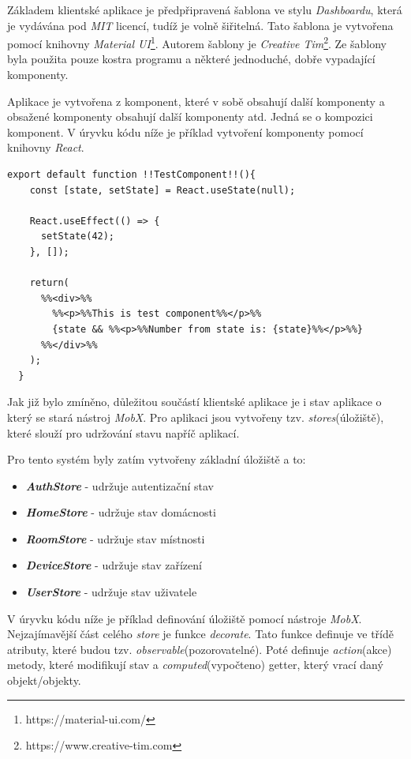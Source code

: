 Základem klientské aplikace je předpřipravená šablona ve stylu \emph{Dashboardu}, která je vydávána pod \emph{MIT} licencí, tudíž je volně šiřitelná.
Tato šablona je vytvořena pomocí knihovny \emph{Material UI}\footnote{https://material-ui.com/}. Autorem šablony je \emph{Creative Tim}\footnote{https://www.creative-tim.com}.
Ze šablony byla použita pouze kostra programu a některé jednoduché, dobře vypadající komponenty.

Aplikace je vytvořena z komponent, které v sobě obsahují další komponenty a obsažené komponenty obsahují další komponenty atd.
Jedná se o kompozici komponent.
V úryvku kódu níže je příklad vytvoření komponenty pomocí knihovny \emph{React}.

\begin{lstlisting}[style=JavaScriptStyle,caption={Ukázka definování komponenty}]
  export default function !!TestComponent!!(){
    const [state, setState] = React.useState(null);

    React.useEffect(() => {
      setState(42);
    }, []);
    
    return(
      %%<div>%%
        %%<p>%%This is test component%%</p>%%
        {state && %%<p>%%Number from state is: {state}%%</p>%%}
      %%</div>%%
    );
  }
\end{lstlisting}

Jak již bylo zmíněno, důležitou součástí klientské aplikace je i stav aplikace o který se stará nástroj \emph{MobX}.
Pro aplikaci jsou vytvořeny tzv. \emph{stores}(úložiště), které slouží pro udržování stavu napříč aplikací.
\newline

Pro tento systém byly zatím vytvořeny základní úložiště a to:
\begin{itemize}
  \item \textbf{\emph{AuthStore}} - udržuje autentizační stav
  \item \textbf{\emph{HomeStore}} - udržuje stav domácnosti
  \item \textbf{\emph{RoomStore}} - udržuje stav místnosti
  \item \textbf{\emph{DeviceStore}} - udržuje stav zařízení
  \item \textbf{\emph{UserStore}} - udržuje stav uživatele
\end{itemize}

\newpage
V úryvku kódu níže je příklad definování úložiště pomocí nástroje \emph{MobX}.
Nejzajímavější část celého \emph{store} je funkce \emph{decorate}.
Tato funkce definuje ve třídě atributy, které budou tzv. \emph{observable}(pozorovatelné).
Poté definuje \emph{action}(akce) metody,
které modifikují stav a \emph{computed}(vypočteno) getter, který vrací daný objekt/objekty.

